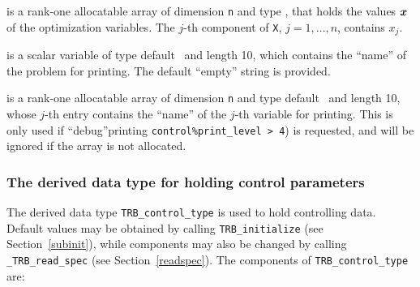 \documentclass{galahad}
\newcommand{\packagename}{TRB}
\newcommand{\fullpackagename}{\libraryname\_\packagename}
\begin{document}
\begin{description}
 is a rank-one allocatable array of dimension {\tt n} and type
\realdp,
that holds the values ${\bm{x}}$ of the optimization variables.
The $j$-th component of {\tt X}, $j = 1,  \ldots , n$, contains $x_{j}$.

 is a scalar variable of type
default \character\ and length 10, which contains the
``name'' of the problem for printing. The default ``empty'' string is
provided.

 is a rank-one allocatable array of dimension {\tt n} and type
default \character\ and length 10, whose $j$-th entry contains the
``name'' of the $j$-th variable for printing. This is only used
if ``debug''printing {\tt control\%print\_level > 4}) is requested,
and will be ignored if the array is not allocated.

\end{description}


\subsubsection{The derived data type for holding control
 parameters}\label{typecontrol}
The derived data type
{\tt \packagename\_control\_type}
is used to hold controlling data. Default values may be obtained by calling
{\tt \packagename\_initialize}
(see Section~\ref{subinit}),
while components may also be changed by calling
{\tt \fullpackagename\_read\-\_spec}
(see Section~\ref{readspec}).
The components of
{\tt \packagename\_control\_type}
are:
\end{document}

